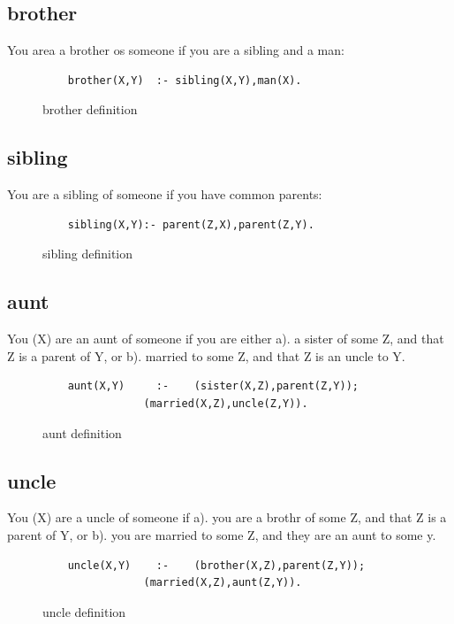 \documentclass[12pt]{article}
\begin{document}
\subsection{brother}
You area a brother os someone if you are a sibling and a man:
\begin{figure}[!h]
 \begin{lstlisting}
	brother(X,Y)  :- sibling(X,Y),man(X).
 \end{lstlisting}
\caption{brother definition}
\label{spec}
\end{figure}


\subsection{sibling}
You are a sibling of someone if you have common parents:
\begin{figure}[!h]
 \begin{lstlisting}
	sibling(X,Y):- parent(Z,X),parent(Z,Y).
 \end{lstlisting}
\caption{sibling definition}
\label{spec}
\end{figure}


\subsection{aunt}
You (X) are an aunt of someone if you are either a). a sister of some Z, and that Z is a parent of Y, or 
b). married to some Z, and that Z is an uncle to Y.
\begin{figure}[!h]
 \begin{lstlisting}
	aunt(X,Y)     :- 	(sister(X,Z),parent(Z,Y));
				(married(X,Z),uncle(Z,Y)).
 \end{lstlisting}
\caption{aunt definition}
\label{spec}
\end{figure}

\pagebreak

\subsection{uncle}
You (X) are a uncle of someone if a). you are a brothr of some Z, and that Z is a parent of Y, or 
b). you are married to some Z, and they are an aunt to some y.
\begin{figure}[!h]
 \begin{lstlisting}
	uncle(X,Y)    :- 	(brother(X,Z),parent(Z,Y)); 
				(married(X,Z),aunt(Z,Y)).
 \end{lstlisting}
\caption{uncle definition}
\label{spec}
\end{figure}
\end{document}

